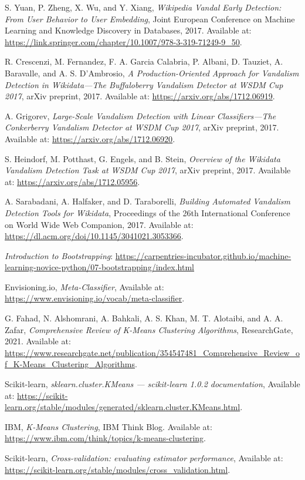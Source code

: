 \documentclass[
    13pt, %
    a4paper, %
    listof=totoc, %
    bibliography=totoc, %
    index=totoc, %
    headsepline
]{scrreprt}
\begin{document}
\begin{thebibliography}{9}
S. Yuan, P. Zheng, X. Wu, and Y. Xiang, 
\textit{Wikipedia Vandal Early Detection: From User Behavior to User Embedding}, 
Joint European Conference on Machine Learning and Knowledge Discovery in Databases, 2017. Available at: \url{https://link.springer.com/chapter/10.1007/978-3-319-71249-9_50}.

R. Crescenzi, M. Fernandez, F. A. Garcia Calabria, P. Albani, D. Tauziet, A. Baravalle, and A. S. D’Ambrosio, 
\textit{A Production-Oriented Approach for Vandalism Detection in Wikidata—The Buffaloberry Vandalism Detector at WSDM Cup 2017}, 
arXiv preprint, 2017. Available at: \url{https://arxiv.org/abs/1712.06919}.

A. Grigorev, 
\textit{Large-Scale Vandalism Detection with Linear Classifiers—The Conkerberry Vandalism Detector at WSDM Cup 2017}, 
arXiv preprint, 2017. Available at: \url{https://arxiv.org/abs/1712.06920}.

S. Heindorf, M. Potthast, G. Engels, and B. Stein, 
\textit{Overview of the Wikidata Vandalism Detection Task at WSDM Cup 2017}, 
arXiv preprint, 2017. Available at: \url{https://arxiv.org/abs/1712.05956}.

A. Sarabadani, A. Halfaker, and D. Taraborelli, 
\textit{Building Automated Vandalism Detection Tools for Wikidata}, 
Proceedings of the 26th International Conference on World Wide Web Companion, 2017. Available at: \url{https://dl.acm.org/doi/10.1145/3041021.3053366}.

\textit{Introduction to Bootstrapping}:
\url{https://carpentries-incubator.github.io/machine-learning-novice-python/07-bootstrapping/index.html}

Envisioning.io, \textit{Meta-Classifier}, 
Available at: \url{https://www.envisioning.io/vocab/meta-classifier}.

G. Fahad, N. Alshomrani, A. Bahkali, A. S. Khan, M. T. Alotaibi, and A. A. Zafar, 
\textit{Comprehensive Review of K-Means Clustering Algorithms}, 
ResearchGate, 2021. Available at: \url{https://www.researchgate.net/publication/354547481_Comprehensive_Review_of_K-Means_Clustering_Algorithms}.

Scikit-learn, 
\textit{sklearn.cluster.KMeans — scikit-learn 1.0.2 documentation}, 
Available at: \url{https://scikit-learn.org/stable/modules/generated/sklearn.cluster.KMeans.html}.

IBM, 
\textit{K-Means Clustering}, 
IBM Think Blog. Available at: \url{https://www.ibm.com/think/topics/k-means-clustering}.

Scikit-learn, 
\textit{Cross-validation: evaluating estimator performance}, 
Available at: \url{https://scikit-learn.org/stable/modules/cross_validation.html}.

\end{thebibliography}
\end{document}
